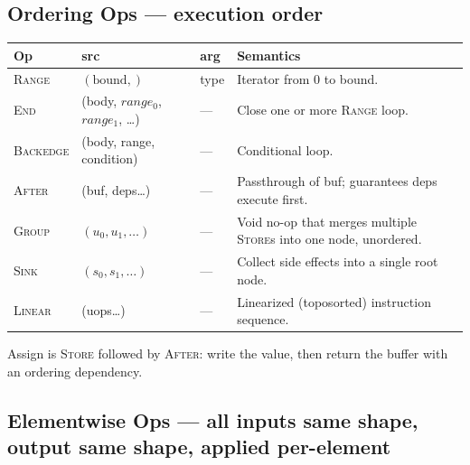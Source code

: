 \documentclass[10pt,letterpaper]{article}
\newcommand{\op}[1]{\textsc{#1}}
\begin{document}
\subsection*{{\color{assignbrown}Ordering Ops} \normalfont\small--- execution order}

\begin{tabular}{@{}l l l p{6.0cm}@{}}
\toprule
\textbf{Op} & \textbf{src} & \textbf{arg} & \textbf{Semantics} \\
\midrule
\op{Range} & $(\text{bound},)$ & type & Iterator from $0$ to bound. \\
\op{End} & (body, $range_0$, $range_1$, \ldots) & --- & Close one or more \op{Range} loop. \\
\op{Backedge} & (body, range, condition) & --- & Conditional loop. \\
\op{After} & (buf, deps\ldots) & --- & Passthrough of buf; guarantees deps execute first. \\
\op{Group} & $(u_0, u_1, \ldots)$ & --- & Void no-op that merges multiple \op{Store}s into one node, unordered. \\
\op{Sink} & $(s_0, s_1, \ldots)$ & --- & Collect side effects into a single root node. \\
\op{Linear} & (uops\ldots) & --- & Linearized (toposorted) instruction sequence. \\
\bottomrule
\end{tabular}

\smallskip
Assign is \op{Store} followed by \op{After}: write the value, then return the buffer with an ordering dependency.

\subsection*{{\color{elwyellow}Elementwise Ops} \normalfont\small--- all inputs same shape, output same shape, applied per-element}
\end{document}
